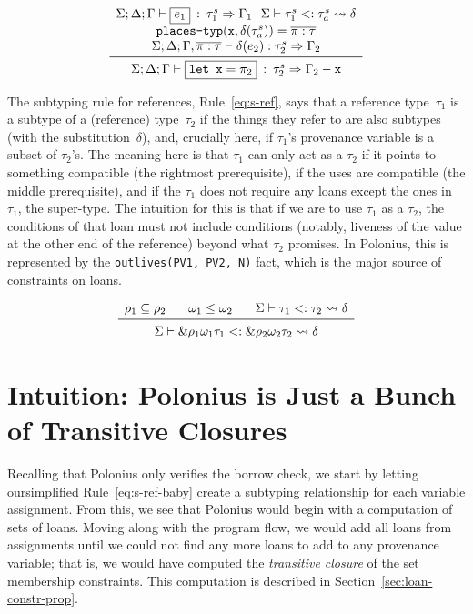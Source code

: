 \documentclass[11pt,a4paper,twoside,openany]{report}
\newcommand{\InDatalog}[1]{\texttt{#1}}
\newcommand{\expression}[1]{\boxed{#1}}
\newcommand{\ntyperule}[2]{\begin{array}{c}#1\\\midrule\raisebox{1pt}{\strut}#2\end{array}}
\renewcommand\_{\textunderscore\allowbreak}
\begin{document}
\begin{equation}\label{eq:t-let}
  \ntyperule{
    \Sigma ; \Delta ; \Gamma \vdash \expression{e_1} \: : \: \tau_1^s \Rightarrow \Gamma_1
    \:\:\: \Sigma \vdash \tau_1 ^s <: \tau_a^s \leadsto \delta \\
    \texttt{places-typ}(\mathtt{x}, \delta(\tau^s_a)) = \overline{\pi : \tau} \\
    \Sigma ; \Delta ; \Gamma, \overline{\pi : \tau} \vdash \delta(e_2) : \tau_2^s \Rightarrow \Gamma_2
  }
  {\Sigma ; \Delta ; \Gamma \vdash \expression{\texttt{let } \mathtt{x} = \pi_2} \: : \: \tau_2^s \Rightarrow \Gamma_2 - \mathtt{x}}
\end{equation}

The subtyping rule for references, Rule~\eqref{eq:s-ref}, says that a reference
type~$\tau_1$ is a subtype of a (reference) type~$\tau_2$ if the things they
refer to are also subtypes (with the substitution~$\delta$), and, crucially
here, if $\tau_1$'s provenance variable is a subset of $\tau_2$'s. The meaning
here is that $\tau_1$ can only act as a $\tau_2$ if it points to something
compatible (the rightmost prerequisite), if the uses are compatible (the middle
prerequisite), and if the $\tau_1$ does not require any loans except the ones in
$\tau_1$, the super-type. The intuition for this is that if we are to use
$\tau_1$ as a $\tau_2$, the conditions of that loan must not include conditions
(notably, liveness of the value at the other end of the reference) beyond what
$\tau_2$ promises. In Polonius, this is represented by the
\InDatalog{outlives(PV1, PV2, N)} fact, which is the major source of constraints
on loans.

\begin{equation}\label{eq:s-ref}
  \ntyperule{
    \rho_1 \subseteq \rho_2 \:\:\:\:\:\:\:\:
    \omega_1 \leq \omega_2 \:\:\:\:\:\:\:\:
    \Sigma \vdash \tau_1 <: \tau_2 \leadsto \delta
  }
  {
    \Sigma \vdash \&\rho_1 \omega_1 \tau_1 <: \& \rho_2 \omega_2 \tau_2 \leadsto \delta
  }
\end{equation}

\section{Intuition: Polonius is Just a Bunch of Transitive
  Closures}\label{sec:borrow-check-intuition}

Recalling that Polonius only verifies the borrow check, we start by letting
oursimplified Rule~\eqref{eq:s-ref-baby} create a subtyping relationship for
each variable assignment. From this, we see that Polonius would begin with a
computation of sets of loans. Moving along with the program flow, we would add
all loans from assignments until we could not find any more loans to add to any
provenance variable; that is, we would have computed the \textit{transitive
  closure} of the set membership constraints. This computation is described in
Section~\ref{sec:loan-constr-prop}.
\end{document}
